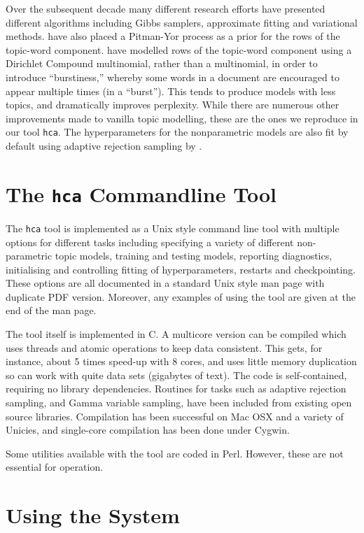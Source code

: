 \documentclass[twoside,11pt]{article}
\begin{document}
Over the subsequent decade many different
research efforts have presented different algorithms including Gibbs
samplers, approximate fitting and variational methods.
\cite{Sato:2010} have also placed a Pitman-Yor process as a prior
for the rows of the topic-word component.
\cite{Doyle:2009} have modelled rows of the topic-word component using
a Dirichlet Compound multinomial, rather than a multinomial,
in order to introduce ``burstiness,'' whereby some words in
a document are encouraged to appear multiple times (in a ``burst'').
This tends to produce models with less topics,
and dramatically improves perplexity.
While there are numerous other improvements made to vanilla topic
modelling, these are the ones we reproduce in our tool {\tt hca}.
The hyperparameters for the nonparametric models are also
fit by default using adaptive rejection sampling by
\cite{gilks1992adaptive}.

\section{The {\tt hca} Commandline Tool}

The {\tt hca} tool is implemented as a Unix style command line tool
with multiple options for different tasks including
specifying a variety of different non-parametric topic models,
training and testing models,
reporting diagnostics, initialising and controlling fitting of
hyperparameters, restarts and checkpointing.
These options are all documented in a standard Unix style man page with
duplicate PDF version.  Moreover, any examples of using the tool
are given at the end of the man page.

The tool itself is implemented in C.  A multicore version
can be compiled which uses threads and atomic operations to
keep data consistent. This gets, for instance, about 5 times speed-up
with 8 cores, and uses little memory duplication so can work with
quite data sets (gigabytes of text).  The code is self-contained,
requiring no library dependencies.  Routines for tasks such as
adaptive rejection sampling, and Gamma variable sampling,
have been included from existing open source libraries.
Compilation has been successful on Mac OSX and a variety of Unicies,
and single-core compilation has been done under Cygwin.

Some utilities available with the tool are coded in Perl.
However, these are not essential for operation.

\section{Using the System}




\end{document}
